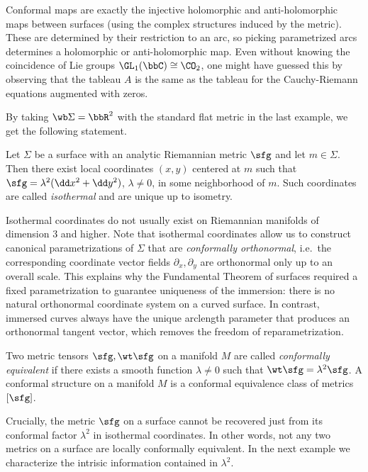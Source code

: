 \begin{example}
    Conformal maps are exactly the injective holomorphic and anti-holomorphic maps between surfaces (using the complex structures induced by the metric). These are determined by their restriction to an arc, so picking parametrized arcs determines a holomorphic or anti-holomorphic map. Even without knowing the coincidence of Lie groups $\GL_1(\bbC)\cong\CO_2$, one might have guessed this by observing that the tableau $A$ is the same as the tableau for the Cauchy-Riemann equations augmented with zeros.
\end{example}

By taking $\wb\Sigma=\bbR^2$ with the standard flat metric in the last example, we get the following statement.

\begin{cor}\label{cor isothermal coords}
    Let $\Sigma$ be a surface with an analytic Riemannian metric $\sfg$ and let $m\in\Sigma$. Then there exist local coordinates $(x,y)$ centered at $m$ such that $\sfg=\lambda^2(\dd x^2+\dd y^2)$, $\lambda\neq 0$, in some neighborhood of $m$. Such coordinates are called \emph{isothermal} and are unique up to isometry. 
\end{cor}

Isothermal coordinates do not usually exist on Riemannian manifolds of dimension $3$ and higher.
Note that isothermal coordinates allow us to construct canonical parametrizations of $\Sigma$ that are \emph{conformally orthonormal}, i.e.\ the corresponding coordinate vector fields $\partial_x,\partial_y$ are orthonormal only up to an overall scale. This explains why the Fundamental Theorem of surfaces required a fixed parametrization to guarantee uniqueness of the immersion: there is no natural orthonormal coordinate system on a curved surface. In contrast, immersed curves always have the unique arclength parameter that produces an orthonormal tangent vector, which removes the freedom of reparametrization.

\begin{defn}
    Two metric tensors $\sfg,\wt\sfg$ on a manifold $M$ are called \emph{conformally equivalent} if there exists a smooth function $\lambda\neq 0$ such that $\wt\sfg=\lambda^2 \sfg$. A conformal structure on a manifold $M$ is a conformal equivalence class of metrics $[\sfg]$.
\end{defn}

Crucially, the metric $\sfg$ on a surface cannot be recovered just from its conformal factor $\lambda^2$ in isothermal coordinates. In other words, not any two metrics on a surface are locally conformally equivalent. In the next example we characterize the intrisic information contained in $\lambda^2$.

